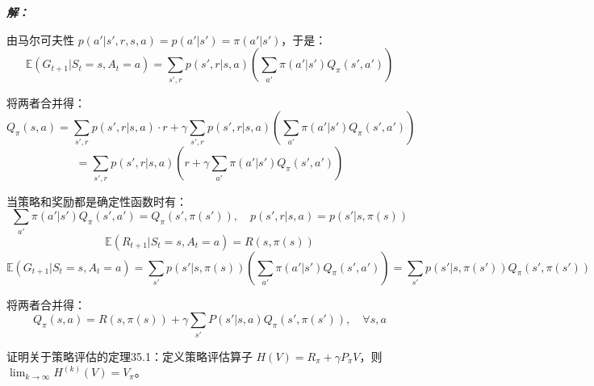 \documentclass[12pt, a4paper]{article}
\newenvironment{solution}{
	\par\vspace{0.2cm}\noindent\textbf{\color{themecolor} \textit{解：}}
}{
	\par\vspace{0.5cm} %
}
\begin{document}
\begin{solution}
		由马尔可夫性 $p(a'|s',r,s,a) = p(a'|s') = \pi(a'|s')$，于是：
		\[ \mathbb{E}(G_{t+1}|S_t=s, A_t=a) = \sum_{s',r} p(s',r|s,a) \left( \sum_{a'} \pi(a'|s') Q_{\pi}(s', a') \right) \]
		
		将两者合并得：
		\[ 
		Q_{\pi}(s,a) 
		= \sum_{s',r} p(s',r|s,a) \cdot r + \gamma \sum_{s',r} p(s',r|s,a) \left( \sum_{a'} \pi(a'|s') Q_{\pi}(s', a') \right) 
		\]
		\[ = \sum_{s',r} p(s',r|s,a) \left( r + \gamma \sum_{a'} \pi(a'|s') Q_{\pi}(s', a') \right) \]
		
		当策略和奖励都是确定性函数时有：
		\[ \sum_{a'} \pi(a'|s') Q_{\pi}(s',a') = Q_{\pi}(s', \pi(s')), \quad p(s',r|s,a) = p(s'|s,\pi(s)) \]
		\[ \mathbb{E}(R_{t+1} | S_t=s, A_t=a) = R(s,\pi(s)) \]
		\[ 
		\mathbb{E}(G_{t+1} | S_t=s, A_t=a) 
		= \sum_{s'} p(s'|s,\pi(s)) \left( \sum_{a'} \pi(a'|s') Q_{\pi}(s',a') \right) 
		= \sum_{s'} p(s'|s,\pi(s')) Q_{\pi}(s', \pi(s')) 
		\]
		
		将两者合并得：
		\[ Q_{\pi}(s,a) = R(s, \pi(s)) + \gamma \sum_{s'} P(s'|s,a) Q_{\pi}(s', \pi(s')), \quad \forall s, a \]
	\end{solution}
	
	\clearpage
	\begin{problem}[习题 35.5]
		证明关于策略评估的定理35.1：定义策略评估算子 $H(V) = R_\pi + \gamma P_\pi V$，则 $\lim_{k \to \infty} H^{(k)}(V) = V_\pi$。
	\end{problem}
	
\end{document}
